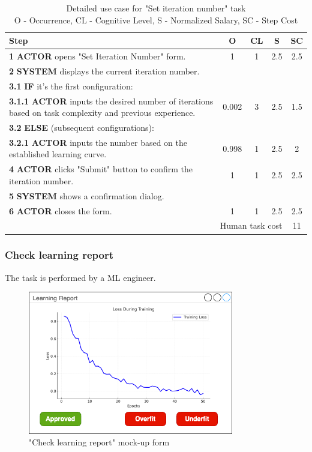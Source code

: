 \begin{table}[H]
\centering
\begin{tabularx}{\textwidth}{|X|c|c|c|c|}
\hline
\textbf{Step} & \textbf{O} & \textbf{CL} & \textbf{S} & \textbf{SC} \\
\hline
\textbf{1} \textbf{ACTOR} opens "Set Iteration Number" form. & 1 & 1 & 2.5 & 2.5 \\
\hline
\textbf{2} \textbf{SYSTEM} displays the current iteration number. & & & & \\
\hline
\textbf{3.1} \textbf {IF} it's the first configuration: &  &  &  & \\
\hline
\textbf{3.1.1} \textbf {ACTOR} inputs the desired number of iterations based on task complexity and previous experience. & 0.002 & 3 & 2.5 & 1.5 \\
\hline
\textbf{3.2} \textbf {ELSE} (subsequent configurations): & & & & \\
\hline
\textbf{3.2.1} \textbf{ACTOR} inputs the number based on the established learning curve. & 0.998 & 1 & 2.5 & 2 \\
\hline
\textbf{4} \textbf{ACTOR} clicks "Submit" button to confirm the iteration number. & 1 & 1 & 2.5 & 2.5 \\
\hline
\textbf{5} \textbf{SYSTEM} shows a confirmation dialog. & & & & \\
\hline
\textbf{6} \textbf{ACTOR} closes the form. & 1 & 1 & 2.5 & 2.5 \\
\hline
\multicolumn{4}{|r|}{Human task cost} & 11\\
\hline
\end{tabularx}
\caption{Detailed use case for "Set iteration number" task\\ 
O - Occurrence, CL - Cognitive Level, S - Normalized Salary, SC - Step Cost}
\label{table:set_iteration_number}
\end{table}

\subsubsection{Check learning report}

The task is performed by a ML engineer.

\begin{figure}[H]
\centering
\includegraphics[width=0.8\textwidth]{figures/check_learning_report.png}
\caption{"Check learning report" mock-up form}
\end{figure}

